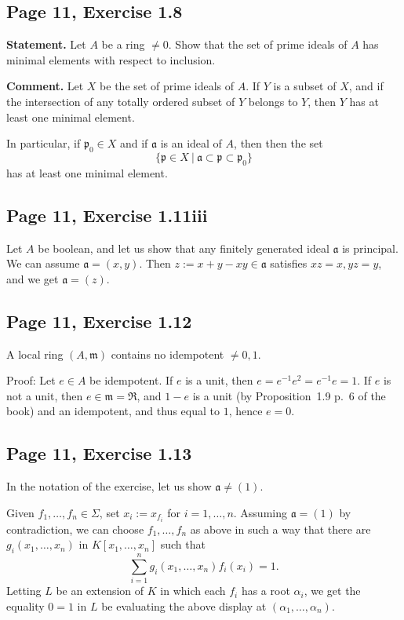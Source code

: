 \documentclass[parskip=half,fontsize=12pt]{scrartcl}%
\newcommand{\mf}{\mathfrak}
\newcommand{\aaa}{\mf a}
\newcommand{\mmm}{\mf m}
\newcommand{\ppp}{\mf p}
\begin{document}
\subsection{Page 11, Exercise 1.8}\label{vp1}%

\textbf{Statement.} Let $A$ be a ring $\ne0$. Show that the set of prime ideals of $A$ has minimal elements with respect to inclusion.

\textbf{Comment.} Let $X$ be the set of prime ideals of $A$. If $Y$ is a subset of $X$, and if the intersection of any totally ordered subset of $Y$ belongs to $Y$, then $Y$ has at least one minimal element.

In particular, if $\ppp_0\in X$ and if $\aaa$ is an ideal of $A$, then then the set 
$$
\{\ppp\in X\ |\ \aaa\subset\ppp\subset\ppp_0\}
$$ 
has at least one minimal element.

\subsection{Page 11, Exercise 1.11iii}%

Let $A$ be boolean, and let us show that any finitely generated ideal $\aaa$ is principal. We can assume $\aaa=(x,y)$. Then $z:=x+y-xy\in\aaa$ satisfies $xz=x,yz=y$, and we get $\aaa=(z)$.

\subsection{Page 11, Exercise 1.12}\label{112}%

A local ring $(A,\mmm)$ contains no idempotent $\neq0,1$. %

Proof: Let $e\in A$ be idempotent. If $e$ is a unit, then $e=e^{-1}e^2=e^{-1}e=1$. If $e$ is not a unit, then $e\in\mmm=\mf R$, and $1-e$ is a unit (by Proposition~1.9 p.~6 of the book) and an idempotent, and thus equal to $1$, hence $e=0$.

\subsection{Page 11, Exercise 1.13}%

In the notation of the exercise, let us show $\aaa\neq(1)$. 

Given $f_1,\dots,f_n\in\Sigma$, set $x_i:=x_{f_i}$ for $i=1,\dots,n$. Assuming $\aaa=(1)$ by contradiction, we can choose $f_1,\dots,f_n$ as above in such a way that there are $g_i(x_1,\dots,x_n)$ in $K[x_1,\dots,x_n]$ such that 
$$
\sum_{i=1}^n g_i(x_1,\dots,x_n)f_i(x_i)=1.
$$ 
Letting $L$ be an extension of $K$ in which each $f_i$ has a root $\alpha_i$, we get the equality $0=1$ in $L$ be evaluating the above display at $(\alpha_1,\dots,\alpha_n)$.
\end{document}
